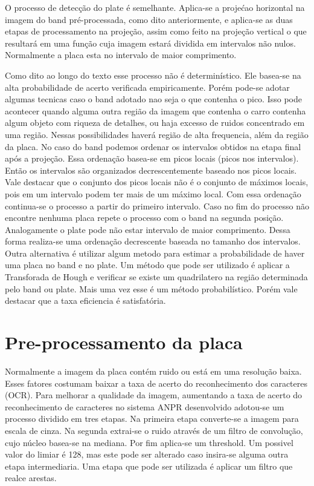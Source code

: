     O processo de detecção do plate é semelhante. Aplica-se a projećao horizontal na imagem do band pré-processada, como dito anteriormente, e aplica-se as duas etapas de processamento na projeção, assim como feito na projeção vertical o que resultará em uma função cuja imagem estará dividida em intervalos não nulos. Normalmente a placa esta no intervalo de maior comprimento.

    Como dito ao longo do texto esse processo não é determinístico. Ele basea-se na alta probabilidade de acerto verificada empiricamente. Porém pode-se adotar algumas tecnicas caso o band adotado nao seja o que contenha o pico. Isso pode acontecer quando alguma outra região da imagem que contenha o carro contenha algum objeto com riqueza de detalhes, ou haja excesso de ruidos concentrado em uma região. Nessas possibilidades haverá região de alta frequencia, além da região da placa. No caso do band podemos ordenar os intervalos obtidos na etapa final após a projeção. Essa ordenação basea-se em picos locais (picos nos intervalos). Então os intervalos são organizados decrescentemente baseado nos picos locais. Vale destacar que o conjunto dos picos locais não é o conjunto de máximos locais, pois em um intervalo podem ter mais de um máximo local. Com essa ordenação continua-se o processo a partir do primeiro intervalo. Caso no fim do processo não encontre nenhuma placa repete o processo com o band na segunda posição. Analogamente o plate pode não estar intervalo de maior comprimento. Dessa forma realiza-se uma ordenação decrescente baseada no tamanho dos intervalos. Outra alternativa é utilizar algum metodo para estimar a probabilidade de haver uma placa no band e no plate. Um método que pode ser utilizado é aplicar a Transforada de Hough e verificar se existe um quadrilatero na região determinada pelo band ou plate. Mais uma vez esse é um método probabilístico. Porém vale destacar que a taxa eficiencia é satisfatória.

    \section{Pre-processamento da placa}

    Normalmente a imagem da placa contém ruido ou está em uma resolução baixa. Esses fatores costumam baixar a taxa de acerto do reconhecimento dos caracteres (OCR). Para melhorar a qualidade da imagem, aumentando a taxa de acerto do reconhecimento de caracteres no sistema ANPR desenvolvido adotou-se um processo dividido em tres etapas. Na primeira etapa converte-se a imagem para escala de cinza. Na segunda extrai-se o ruido através de um filtro de convolução, cujo núcleo basea-se na mediana. Por fim aplica-se um threshold. Um possivel valor do limiar é 128, mas este pode ser alterado caso insira-se alguma outra etapa intermediaria. Uma etapa que pode ser utilizada é aplicar um filtro que realce arestas.


